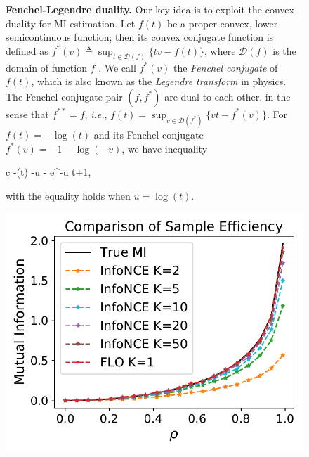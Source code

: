 \documentclass{article}
\theoremstyle{plain}
\theoremstyle{definition}
\theoremstyle{remark}
\renewcommand{\CD}{\mathcal{D}}
\begin{document}
		\begin{figure}
			\begin{minipage}{.63\textwidth}
				{\bf Fenchel-Legendre duality.} Our key idea is to exploit the convex duality for MI estimation. Let $f(t)$ be a proper convex, lower-semicontinuous function; then its {convex conjugate} function is defined as 
				$f^*(v) \triangleq \sup_{t\in \CD(f)}\{ t v - f(t) \}$, where $\CD(f)$ is the domain of function $f$ \citep{hiriart2012fundamentals}. We call $f^*(v)$ the \textit{Fenchel conjugate} of $f(t)$, which is also known as the {\it Legendre transform} in physics. 
				The Fenchel conjugate pair $(f, f^*)$ are dual to each other, in the sense that $f^{**} = f$, \textit{i.e.}, 
				$
				f(t) = \sup_{v\in \CD(f^*)}\{ v t - f^*(v) \}. 
				$
				For $f(t) = -\log(t)$ and its Fenchel conjugate $f^*(v) = -1-\log(-v)$, we have inequality
				\beq
				\label{eq:logt}
				\begin{array}{c}
					-\log(t) \geq -u - e^{-u} t+1, \quad {}
				\end{array}
				\eeq
				with the equality holds when $u=\log(t)$.
			\end{minipage}
			\hspace{3pt}
			\begin{minipage}{.35\textwidth}
				\vspace{-.5em}
				\begin{center}{
						\includegraphics[width=1.0\textwidth]{figures/toy/1dcompare.pdf}
					}

\end{center}
\end{minipage}
\end{figure}
\end{document}
